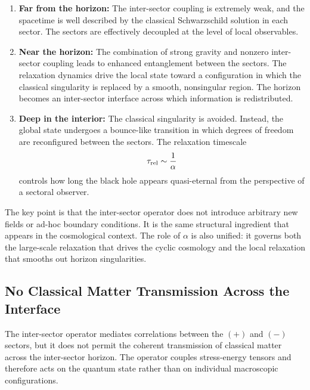 \documentclass[11pt,a4paper]{article}
\begin{document}
\begin{enumerate}
    \item \textbf{Far from the horizon:}  
    The inter-sector coupling is extremely weak, and the spacetime is well described by the 
    classical Schwarzschild solution in each sector. 
    The sectors are effectively decoupled at the level of local observables.

    \item \textbf{Near the horizon:}  
    The combination of strong gravity and nonzero inter-sector coupling leads to enhanced 
    entanglement between the sectors. 
    The relaxation dynamics drive the local state toward a configuration in which the classical 
    singularity is replaced by a smooth, nonsingular region. 
    The horizon becomes an inter-sector interface across which information is redistributed.

    \item \textbf{Deep in the interior:}  
    The classical singularity is avoided. 
    Instead, the global state undergoes a bounce-like transition in which degrees of freedom 
    are reconfigured between the sectors. 
    The relaxation timescale
    \begin{equation}
        \tau_{\rm rel} \sim \frac{1}{\alpha}
    \end{equation}
    controls how long the black hole appears quasi-eternal from the perspective of a sectoral observer.
\end{enumerate}

The key point is that the inter-sector operator does not introduce arbitrary new fields or 
ad-hoc boundary conditions. 
It is the same structural ingredient that appears in the cosmological context. 
The role of \(\alpha\) is also unified: it governs both the large-scale relaxation that drives the 
cyclic cosmology and the local relaxation that smooths out horizon singularities.

\subsection{No Classical Matter Transmission Across the Interface}

The inter-sector operator mediates correlations between the $(+)$ and $(-)$ sectors, but it does
not permit the coherent transmission of classical matter across the inter-sector horizon. The
operator couples stress-energy tensors and therefore acts on the quantum state rather than on
individual macroscopic configurations.
\end{document}
